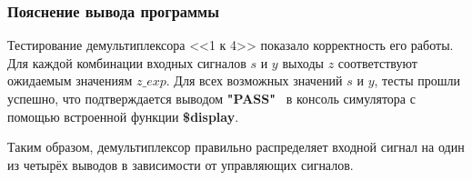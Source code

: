 \subsubsection{Пояснение вывода программы}

Тестирование демультиплексора <<1 к 4>> показало корректность его работы. Для каждой комбинации входных сигналов $s$ и $y$ выходы $z$ соответствуют ожидаемым значениям $z\_exp$. Для всех возможных значений $s$ и $y$, тесты прошли успешно, что подтверждается выводом \textbf{"PASS"} \ в консоль симулятора с помощью встроенной функции \textbf{\$display}.

Таким образом, демультиплексор правильно распределяет входной сигнал на один из четырёх выводов в зависимости от управляющих сигналов.
